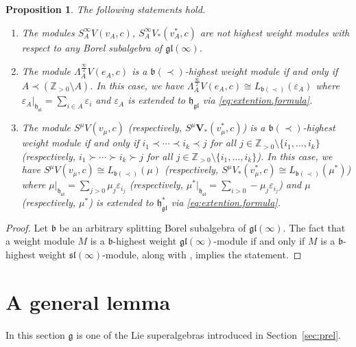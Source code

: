 \documentclass[12pt]{amsart}
\newcommand\Z{\mathbb{Z}}
\newcommand\g{\mathfrak{g}}
\newcommand\fh{\mathfrak{h}}
\newcommand\fb{\mathfrak{b}}
\newcommand\fsl{\mathfrak{sl}}
\newcommand\fgl{\mathfrak{gl}}
\newcommand\bV{\mathbf{V}}
\theoremstyle{plain}
\newtheorem{prop}[theo]{Proposition}
\theoremstyle{definition}
\numberwithin{equation}{section}
\begin{document}
\begin{prop}\label{prop:h.w.gl(infty)}
The following statements hold.
\begin{enumerate}
\item The modules $S^\infty_A V(v_A, c)$, $S^\infty_A V_*(v_A^*, c)$ are not highest weight modules with respect to any Borel subalgebra of $\fgl(\infty)$.
\item The module $\Lambda^{\frac{\infty}{2}}_A V(e_A, c)$ is a $\fb(\prec)$-highest weight module if and only if $A\prec (\Z_{>0}\setminus A)$. In this case, we have $\Lambda^{\frac{\infty}{2}}_A V(e_A, c)\cong L_{\fb(\prec)}(\varepsilon_A)$ where $\varepsilon_A |_{\fh_\fsl} = \sum_{i\in A}\varepsilon_i$ and $\varepsilon_A$ is extended to $\fh_\fgl$ via \eqref{eq:extention.formula}.
\item The module $S^\mu V(v_\mu, c)$ (respectively, $S^\mu \bV_*(v_\mu^*, c)$) is a $\fb(\prec)$-highest weight module if and only if $i_1\prec \cdots \prec i_k\prec j$ for all $j\in \Z_{>0}\setminus \{i_1,\ldots, i_k\}$ (respectively, $i_1\succ \cdots \succ i_k\succ j$ for all $j\in \Z_{>0}\setminus \{i_1,\ldots, i_k\}$). In this case, we have $S^\mu V(v_\mu, c)\cong L_{\fb(\prec)} (\mu)$ (respectively, $S^\mu V_*(v_\mu^*, c)\cong L_{\fb(\prec)} (\mu^*)$) where $\mu |_{\fh_\fsl} = \sum_{j>0} \mu_j\varepsilon_{i_j}$ (respectively, $\mu^* |_{\fh_\fsl} = \sum_{i>0} -\mu_j\varepsilon_{i_j}$) and $\mu$ (respectively, $\mu^*$) is extended to  $\fh_\fgl^*$ via \eqref{eq:extention.formula}.
\end{enumerate}
\end{prop}
\begin{proof}
Let $\fb$ be an arbitrary splitting Borel subalgebra of $\fgl(\infty)$. The fact that a weight module $M$ is a $\fb$-highest weight $\fgl(\infty)$-module if and only if $M$ is a $\fb$-highest weight $\fsl(\infty)$-module, along with \cite[Proposition~5.2]{GP20}, implies the statement.
\end{proof}

\section{A general lemma}\label{sec:generalities.super}

In this section $\g$ is one of the Lie superalgebras introduced in Section~\ref{sec:prel}.
\end{document}
